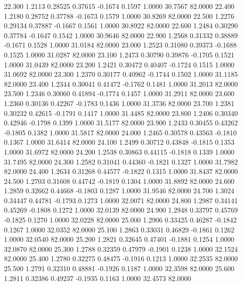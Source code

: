  22.300   1.2113   0.28525   0.37615  -0.1674   0.1597   1.0000  30.7567  82.0000
  22.400   1.2180   0.28752   0.37788  -0.1673   0.1579   1.0000  30.8269  82.0000
  22.500   1.2276   0.29134   0.37887  -0.1667   0.1561   1.0000  30.8922  82.0000
  22.600   1.2484   0.30290   0.37784  -0.1647   0.1542   1.0000  30.9646  82.0000
  22.900   1.2568   0.31332   0.38889  -0.1671   0.1528   1.0000  31.0184  82.0000
  23.000   1.2523   0.31080   0.39373  -0.1688   0.1525   1.0000  31.0287  82.0000
  23.100   1.2473   0.30790   0.39876  -0.1705   0.1521   1.0000  31.0439  82.0000
  23.200   1.2421   0.30472   0.40407  -0.1724   0.1515   1.0000  31.0692  82.0000
  23.300   1.2370   0.30177   0.40962  -0.1744   0.1502   1.0000  31.1185  82.0000
  23.400   1.2344   0.30041   0.41472  -0.1762   0.1481   1.0000  31.2013  82.0000
  23.500   1.2346   0.30060   0.41894  -0.1774   0.1457   1.0000  31.2911  82.0000
  23.600   1.2360   0.30136   0.42267  -0.1783   0.1436   1.0000  31.3736  82.0000
  23.700   1.2381   0.30232   0.42615  -0.1791   0.1417   1.0000  31.4485  82.0000
  23.800   1.2406   0.30340   0.42946  -0.1798   0.1399   1.0000  31.5177  82.0000
  23.900   1.2433   0.30455   0.43262  -0.1805   0.1382   1.0000  31.5817  82.0000
  24.000   1.2465   0.30578   0.43563  -0.1810   0.1367   1.0000  31.6414  82.0000
  24.100   1.2499   0.30712   0.43848  -0.1815   0.1353   1.0000  31.6972  82.0000
  24.200   1.2538   0.30863   0.44115  -0.1818   0.1339   1.0000  31.7495  82.0000
  24.300   1.2582   0.31041   0.44360  -0.1821   0.1327   1.0000  31.7982  82.0000
  24.400   1.2634   0.31268   0.44577  -0.1822   0.1315   1.0000  31.8437  82.0000
  24.500   1.2703   0.31608   0.44742  -0.1819   0.1304   1.0000  31.8892  82.0000
  24.600   1.2859   0.32662   0.44668  -0.1803   0.1287   1.0000  31.9546  82.0000
  24.700   1.3024   0.34447   0.44781  -0.1793   0.1273   1.0000  32.0071  82.0000
  24.800   1.2987   0.34141   0.45269  -0.1808   0.1272   1.0000  32.0139  82.0000
  24.900   1.2948   0.33797   0.45769  -0.1825   0.1270   1.0000  32.0228  82.0000
  25.000   1.2906   0.33425   0.46287  -0.1842   0.1267   1.0000  32.0352  82.0000
  25.100   1.2863   0.33031   0.46829  -0.1861   0.1262   1.0000  32.0540  82.0000
  25.200   1.2821   0.32645   0.47401  -0.1881   0.1254   1.0000  32.0870  82.0000
  25.300   1.2788   0.32359   0.47979  -0.1901   0.1238   1.0000  32.1524  82.0000
  25.400   1.2780   0.32275   0.48475  -0.1916   0.1213   1.0000  32.2535  82.0000
  25.500   1.2791   0.32310   0.48881  -0.1926   0.1187   1.0000  32.3598  82.0000
  25.600   1.2811   0.32386   0.49237  -0.1935   0.1163   1.0000  32.4573  82.0000
